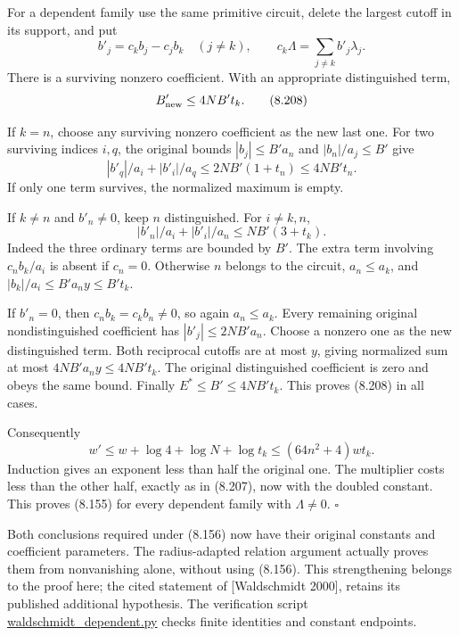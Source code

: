 \documentclass[
  11pt,
  a4paper,
]{article}
\begin{document}
For a dependent family use the same primitive circuit, delete the
largest cutoff in its support, and put \[
b'_j=c_kb_j-c_jb_k\quad(j\ne k),\qquad
c_k\Lambda=\sum_{j\ne k}b'_j\lambda_j.
\] There is a surviving nonzero coefficient. With an appropriate
distinguished term, \[
B'_{\rm new}\le4NB't_k.
\tag{8.208}
\]

If \(k=n\), choose any surviving nonzero coefficient as the new last
one. For two surviving indices \(i,q\), the original bounds
\(|b_j|\le B'a_n\) and \(|b_n|/a_j\le B'\) give \[
|b'_q|/a_i+|b'_i|/a_q
\le2NB'(1+t_n)\le4NB't_n.
\] If only one term survives, the normalized maximum is empty.

If \(k\ne n\) and \(b'_n\ne0\), keep \(n\) distinguished. For
\(i\ne k,n\), \[
|b'_n|/a_i+|b'_i|/a_n\le NB'(3+t_k).
\] Indeed the three ordinary terms are bounded by \(B'\). The extra term
involving \(c_n b_k/a_i\) is absent if \(c_n=0\). Otherwise \(n\)
belongs to the circuit, \(a_n\le a_k\), and
\(|b_k|/a_i\le B'a_n y\le B't_k\).

If \(b'_n=0\), then \(c_n b_k=c_kb_n\ne0\), so again \(a_n\le a_k\).
Every remaining original nondistinguished coefficient has
\(|b'_j|\le2NB'a_n\). Choose a nonzero one as the new distinguished
term. Both reciprocal cutoffs are at most \(y\), giving normalized sum
at most \(4NB'a_n y\le4NB't_k\). The original distinguished coefficient
is zero and obeys the same bound. Finally \(E^*\le B'\le4NB't_k\). This
proves (8.208) in all cases.

Consequently \[
w'\le w+\log4+\log N+\log t_k
\le(64n^2+4)w t_k.
\] Induction gives an exponent less than half the original one. The
multiplier costs less than the other half, exactly as in (8.207), now
with the doubled constant. This proves (8.155) for every dependent
family with \(\Lambda\ne0\). \(\square\)

Both conclusions required under (8.156) now have their original
constants and coefficient parameters. The radius-adapted relation
argument actually proves them from nonvanishing alone, without using
(8.156). This strengthening belongs to the proof here; the cited
statement of {[}Waldschmidt 2000{]}, retains its published additional
hypothesis. The verification script
\href{https://kokunoyumeto.github.io/open-math-courses-public/courses/TR-BAKER/verification/waldschmidt_dependent.py}{waldschmidt\_dependent.py}
checks finite identities and constant endpoints.
\end{document}
